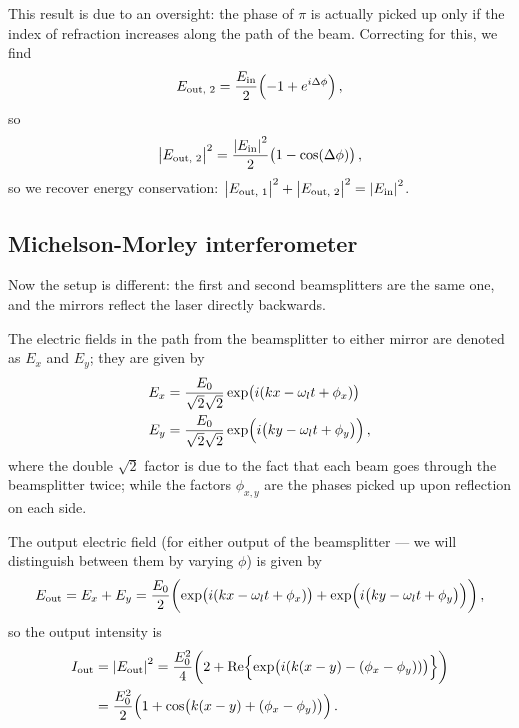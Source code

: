 \documentclass[main.tex]{subfiles}
\begin{document}
This result is due to an oversight: the phase of \(\pi \) is actually picked up only if the index of refraction increases along the path of the beam. Correcting for this, we find 
%
\begin{align}
E _{\text{out, }2}= \frac{E_{\text{in}}}{2} \qty(-1 + e^{i \Delta \phi })
\,,
\end{align}
%
so 
%
\begin{align}
\abs{E _{\text{out, }2}}^2 = \frac{\abs{E _{\text{in}}}^2}{2} \qty(1 - \cos(\Delta \phi))
\,,
\end{align}
%
so we recover energy conservation: \(\abs{E _{\text{out, }1}}^2 + \abs{E _{\text{out, }2}}^2 = \abs{E _{\text{in}}}^2\).

\subsection{Michelson-Morley interferometer}

Now the setup is different: the first and second beamsplitters are the same one, and the mirrors reflect the laser directly backwards. 

The electric fields in the path from the beamsplitter to either mirror are denoted as \(E_x\) and \(E_y\); they are given by 
%
\begin{align}
E_{x} &= \frac{E_0 }{\sqrt{2} \sqrt{2}}
\exp(i \qty(kx - \omega_{l}t + \phi_{x})) \\
E_{y} &= \frac{E_0 }{\sqrt{2} \sqrt{2}}
\exp(i \qty(ky - \omega_{l}t + \phi_{y}))
\,,
\end{align}
%
where the double \(\sqrt{2}\) factor is due to the fact that each beam goes through the beamsplitter twice; while the factors \(\phi_{x, y}\) are the phases picked up upon reflection on each side. 

The output electric field (for either output of the beamsplitter --- we will distinguish between them by varying \(\phi \)) is given by 
%
\begin{align}
E _{\text{out}} = E_{x} + E_{y}
= \frac{E_0}{2} \qty(\exp(i \qty(kx - \omega_{l}t + \phi_{x})) + \exp(i \qty(ky - \omega_{l}t + \phi_{y})))
\,,
\end{align}
%
so the output intensity is 
%
\begin{align}
I _{\text{out}} &= \abs{E _{\text{out}}}^2 
= \frac{E_0^2}{4} \qty(2 + \Re{\exp(i(k(x-y) - (\phi_{x} - \phi_{y}) ))})  \\
&= \frac{E_0^2}{2} \qty(1 + \cos(k(x-y) + (\phi_{x} - \phi_{y})))
\,.
\end{align}
\end{document}
